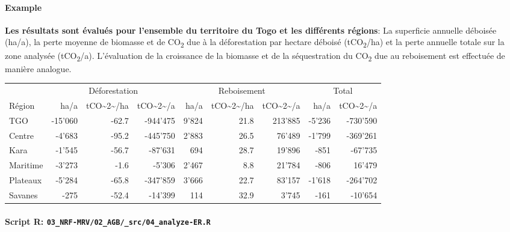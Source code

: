 \documentclass[a4paper, notitlepage, 12pt, krantz2]{krantz}
\let\oldparagraph\paragraph
\renewcommand{\paragraph}[1]{\oldparagraph{#1}\mbox{}}
\begin{document}
\hypertarget{example-9}{%
\paragraph{Example}\label{example-9}}

\textbf{Les résultats sont évalués pour l'ensemble du territoire du Togo et les différents régions}: La superficie annuelle déboisée (ha/a), la perte moyenne de biomasse et de CO\textsubscript{2} due à la déforestation par hectare déboisé (tCO\textsubscript{2}/ha) et la perte annuelle totale sur la zone analysée (tCO\textsubscript{2}/a). L'évaluation de la croissance de la biomasse et de la séquestration du CO\textsubscript{2} due au reboisement est effectuée de manière analogue.

\begin{table}[H]
\centering
\begin{tabular}{l|r|r|r|r|r|r|r|r}
\hline
\multicolumn{1}{c|}{ } & \multicolumn{3}{c|}{Déforestation} & \multicolumn{3}{c|}{Reboisement} & \multicolumn{2}{c}{Total} \\
\cline{2-4} \cline{5-7} \cline{8-9}
Région & ha/a & tCO\textasciitilde{}2\textasciitilde{}/ha & tCO\textasciitilde{}2\textasciitilde{}/a & ha/a & tCO\textasciitilde{}2\textasciitilde{}/ha & tCO\textasciitilde{}2\textasciitilde{}/a & ha/a & tCO\textasciitilde{}2\textasciitilde{}/a\\
\hline
TGO & -15'060 & -62.7 & -944'475 & 9'824 & 21.8 & 213'885 & -5'236 & -730'590\\
\hline
Centre & -4'683 & -95.2 & -445'750 & 2'883 & 26.5 & 76'489 & -1'799 & -369'261\\
\hline
Kara & -1'545 & -56.7 & -87'631 & 694 & 28.7 & 19'896 & -851 & -67'735\\
\hline
Maritime & -3'273 & -1.6 & -5'306 & 2'467 & 8.8 & 21'784 & -806 & 16'479\\
\hline
Plateaux & -5'284 & -65.8 & -347'859 & 3'666 & 22.7 & 83'157 & -1'618 & -264'702\\
\hline
Savanes & -275 & -52.4 & -14'399 & 114 & 32.9 & 3'745 & -161 & -10'654\\
\hline
\end{tabular}
\end{table}

\hypertarget{script-r-03_nrf-mrv02_agb_src04_analyze-er.r}{%
\paragraph{\texorpdfstring{Script R: \texttt{03\_NRF-MRV/02\_AGB/\_src/04\_analyze-ER.R}}{Script R: 03\_NRF-MRV/02\_AGB/\_src/04\_analyze-ER.R}}\label{script-r-03_nrf-mrv02_agb_src04_analyze-er.r}}
\end{document}
